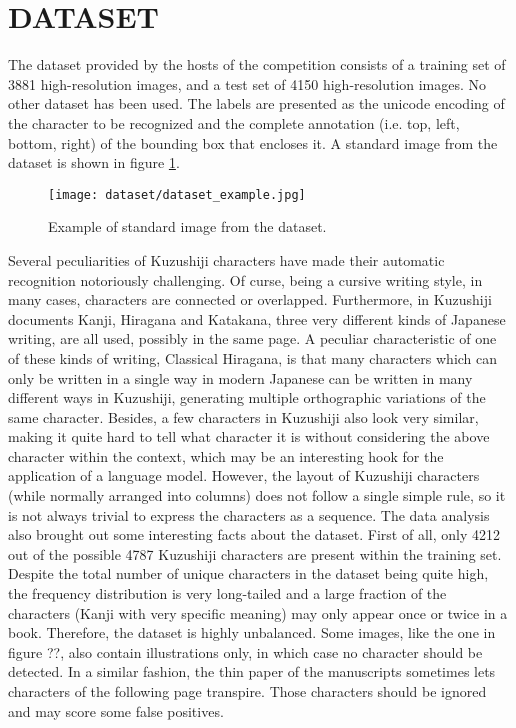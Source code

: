 \section{DATASET}
\label{sec:dataset}

The dataset provided by the hosts of the competition consists of a training set of 3881 high-resolution images, and a test set of 4150 high-resolution images. No other dataset  has been used. The labels are presented as the unicode encoding of the character to be recognized and the complete annotation (i.e. top, left, bottom, right) of the bounding box that encloses it. A standard image from the dataset is shown in figure \ref{fig:dataset_example}.

\begin{figure}[h]
	\caption{Example of standard image from the dataset.}
	\centering
	\texttt{[image: dataset/dataset\_example.jpg]}
	\label{fig:dataset_example}
\end{figure}

Several peculiarities of Kuzushiji characters have made their automatic recognition notoriously challenging. Of curse, being a cursive writing style, in many cases, characters are connected or overlapped. Furthermore, in Kuzushiji documents Kanji, Hiragana and Katakana, three very different kinds of Japanese writing, are all used, possibly in the same page. A peculiar characteristic of one of these kinds of writing, Classical Hiragana, is that many characters which can only be written in a single way in modern Japanese can be written in many different ways in Kuzushiji, generating multiple orthographic variations of the same character. Besides, a few characters in Kuzushiji also look very similar, making it quite hard to tell what character it is without considering the above character within the context, which may be an interesting hook for the application of a language model. However, the layout of Kuzushiji characters (while normally arranged into columns) does not follow a single simple rule, so it is not always trivial to express the characters as a sequence. The data analysis also brought out some interesting facts about the dataset. First of all, only 4212 out of the possible 4787 Kuzushiji characters are present within the training set. Despite the total number of unique characters in the dataset being quite high, the frequency distribution is very long-tailed and a large fraction of the characters (Kanji with very specific meaning) may only appear once or twice in a book. Therefore, the dataset is highly unbalanced. Some images, like the one in figure ??, also contain illustrations only, in which case no character should be detected. In a similar fashion, the thin paper of the manuscripts sometimes lets characters of the following page transpire. Those characters should be ignored and may score some false positives.
